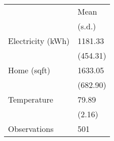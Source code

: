 \begin{tabular}{ll}
\toprule
{} &      Mean \\
{} &    (s.d.) \\
\midrule
Electricity (kWh) &   1181.33 \\
                  &  (454.31) \\
Home (sqft)       &   1633.05 \\
                  &  (682.90) \\
Temperature       &     79.89 \\
                  &    (2.16) \\
Observations      &       501 \\
\bottomrule
\end{tabular}
